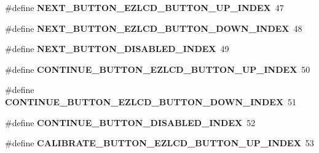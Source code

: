 \begin{DoxyCompactItemize}
\item 
\hypertarget{group__ez_l_c_d__103__user__config_ga50a5f41d9c4fd03f31dcd8f5916cf03b}{\#define {\bfseries N\-E\-X\-T\-\_\-\-B\-U\-T\-T\-O\-N\-\_\-\-E\-Z\-L\-C\-D\-\_\-\-B\-U\-T\-T\-O\-N\-\_\-\-U\-P\-\_\-\-I\-N\-D\-E\-X}~47}\label{group__ez_l_c_d__103__user__config_ga50a5f41d9c4fd03f31dcd8f5916cf03b}

\item 
\hypertarget{group__ez_l_c_d__103__user__config_ga691c6d9e919b080ec57b24b071622aab}{\#define {\bfseries N\-E\-X\-T\-\_\-\-B\-U\-T\-T\-O\-N\-\_\-\-E\-Z\-L\-C\-D\-\_\-\-B\-U\-T\-T\-O\-N\-\_\-\-D\-O\-W\-N\-\_\-\-I\-N\-D\-E\-X}~48}\label{group__ez_l_c_d__103__user__config_ga691c6d9e919b080ec57b24b071622aab}

\item 
\hypertarget{group__ez_l_c_d__103__user__config_gac8adfbd7c27869896cd6df202761022c}{\#define {\bfseries N\-E\-X\-T\-\_\-\-B\-U\-T\-T\-O\-N\-\_\-\-D\-I\-S\-A\-B\-L\-E\-D\-\_\-\-I\-N\-D\-E\-X}~49}\label{group__ez_l_c_d__103__user__config_gac8adfbd7c27869896cd6df202761022c}

\item 
\hypertarget{group__ez_l_c_d__103__user__config_gaa29c562fc6a558381f13a9f2eebd3295}{\#define {\bfseries C\-O\-N\-T\-I\-N\-U\-E\-\_\-\-B\-U\-T\-T\-O\-N\-\_\-\-E\-Z\-L\-C\-D\-\_\-\-B\-U\-T\-T\-O\-N\-\_\-\-U\-P\-\_\-\-I\-N\-D\-E\-X}~50}\label{group__ez_l_c_d__103__user__config_gaa29c562fc6a558381f13a9f2eebd3295}

\item 
\hypertarget{group__ez_l_c_d__103__user__config_ga7ef61a9e4ff8d357ce6afbe755c2a19f}{\#define {\bfseries C\-O\-N\-T\-I\-N\-U\-E\-\_\-\-B\-U\-T\-T\-O\-N\-\_\-\-E\-Z\-L\-C\-D\-\_\-\-B\-U\-T\-T\-O\-N\-\_\-\-D\-O\-W\-N\-\_\-\-I\-N\-D\-E\-X}~51}\label{group__ez_l_c_d__103__user__config_ga7ef61a9e4ff8d357ce6afbe755c2a19f}

\item 
\hypertarget{group__ez_l_c_d__103__user__config_ga5f31de95528825be70fc3d4a33db936f}{\#define {\bfseries C\-O\-N\-T\-I\-N\-U\-E\-\_\-\-B\-U\-T\-T\-O\-N\-\_\-\-D\-I\-S\-A\-B\-L\-E\-D\-\_\-\-I\-N\-D\-E\-X}~52}\label{group__ez_l_c_d__103__user__config_ga5f31de95528825be70fc3d4a33db936f}

\item 
\hypertarget{group__ez_l_c_d__103__user__config_gaa0b489b8ca17de70d345d2325c0f3e02}{\#define {\bfseries C\-A\-L\-I\-B\-R\-A\-T\-E\-\_\-\-B\-U\-T\-T\-O\-N\-\_\-\-E\-Z\-L\-C\-D\-\_\-\-B\-U\-T\-T\-O\-N\-\_\-\-U\-P\-\_\-\-I\-N\-D\-E\-X}~53}\label{group__ez_l_c_d__103__user__config_gaa0b489b8ca17de70d345d2325c0f3e02}


\end{DoxyCompactItemize}
